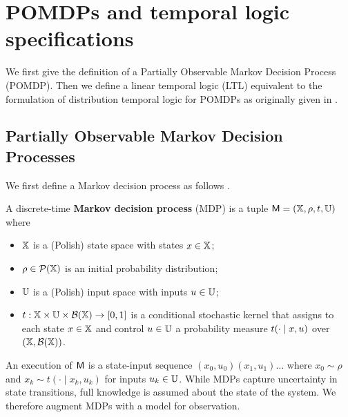 \documentclass{ifacconf}
\newcommand{\new}[1]{{\color{blue}#1}}
\newcommand{\cristi}[1]{{\color{orange}#1}}
\begin{document}
 
\section{POMDPs and temporal logic specifications}

We first give the definition of a Partially Observable Markov Decision Process (POMDP). Then we define a linear temporal logic (LTL) equivalent to the formulation of distribution temporal logic for POMDPs as originally given in \citep{JonesDTL2013}. 

\subsection{Partially Observable Markov  Decision Processes}
    
We first define a Markov decision process as follows \citep{hll1996}.
\begin{definition}
\label{def:MDP} 
  A discrete-time \textbf{Markov decision process} (MDP) is a tuple $\mathsf{M} = ({\mathbb{X}}, \rho, t, {\mathbb{U}})$ where
  \begin{itemize}
    \item ${\mathbb{X}}$ is a \new{(Polish)} state space with states $x\in{\mathbb{X}}$; %
    \item $\rho \in \mathcal P({\mathbb{X}})$ is an initial probability distribution;
    \item ${\mathbb{U}}$ is a \new{(Polish)} input space with inputs $u\in{\mathbb{U}}$;
    \item $t:{\mathbb{X}}\times{\mathbb{U}}\times\mathcal B({\mathbb{X}})\rightarrow[0,1]$ is a conditional stochastic kernel that assigns to each state $x\in {\mathbb{X}}$ and control $u\in {\mathbb{U}}$ a probability measure $t(\cdot\mid x,u)$ over $({\mathbb{X}},\mathcal B({\mathbb{X}}))$.
  \end{itemize}
\end{definition}

An execution of $\mathsf{M}$ is a state-input sequence $(x_0, u_0)(x_1, u_1)\ldots$ where $x_0 \sim \rho$ and $x_k \sim t(\cdot \mid x_k, u_k)$ for inputs $u_k \in {\mathbb{U}}$. While MDPs capture uncertainty in state transitions, full knowledge is assumed about the state of the system. We therefore augment MDPs with a model for observation.
 
  
\end{document}
